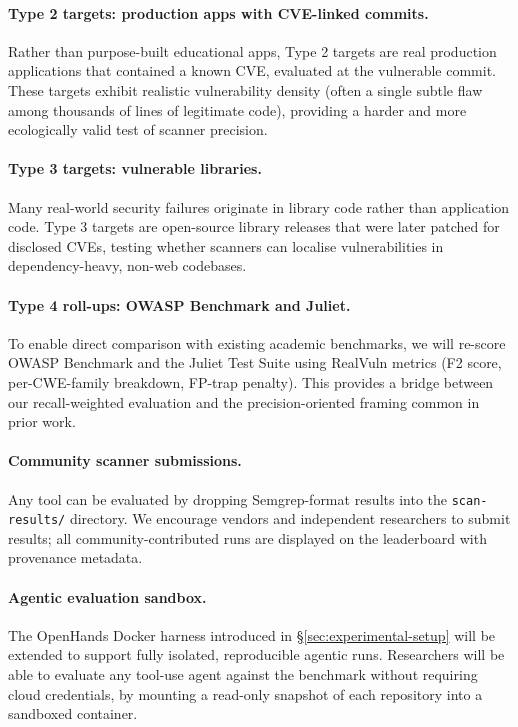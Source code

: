 \paragraph{Type 2 targets: production apps with CVE-linked commits.}
Rather than purpose-built educational apps, Type 2 targets are real production
applications that contained a known CVE, evaluated at the vulnerable commit.
These targets exhibit realistic vulnerability density (often a single subtle
flaw among thousands of lines of legitimate code), providing a harder and more
ecologically valid test of scanner precision.

\paragraph{Type 3 targets: vulnerable libraries.}
Many real-world security failures originate in library code rather than
application code.  Type 3 targets are open-source library releases that were
later patched for disclosed CVEs, testing whether scanners can localise
vulnerabilities in dependency-heavy, non-web codebases.

\paragraph{Type 4 roll-ups: OWASP Benchmark and Juliet.}
To enable direct comparison with existing academic benchmarks, we will
re-score OWASP Benchmark and the Juliet Test Suite using RealVuln metrics
(F2 score, per-CWE-family breakdown, FP-trap penalty).  This provides a
bridge between our recall-weighted evaluation and the precision-oriented
framing common in prior work.

\paragraph{Community scanner submissions.}
Any tool can be evaluated by dropping Semgrep-format results into the
\texttt{scan-results/} directory.  We encourage vendors and independent
researchers to submit results; all community-contributed runs are displayed on
the leaderboard with provenance metadata.

\paragraph{Agentic evaluation sandbox.}
The OpenHands Docker harness introduced in \S\ref{sec:experimental-setup}
will be extended to support fully isolated, reproducible agentic runs.
Researchers will be able to evaluate any tool-use agent against the benchmark
without requiring cloud credentials, by mounting a read-only snapshot of each
repository into a sandboxed container.

